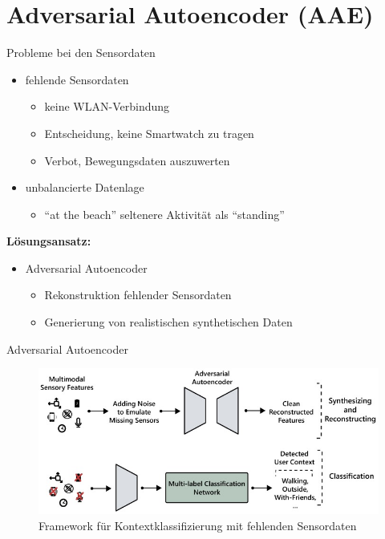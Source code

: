 \documentclass[10pt,%
	wide,%
	xcolor={x11names},%
	hyperref={colorlinks},%
	pantone312,%
	handout,%
	]{beamer}
\begin{document}
\section{Adversarial Autoencoder (AAE)}

\begin{frame}[t]{Probleme bei den Sensordaten}
	\begin{itemize}
		\item fehlende Sensordaten
		\begin{itemize}
			\item keine WLAN-Verbindung
			\item Entscheidung, keine Smartwatch zu tragen
			\item Verbot, Bewegungsdaten auszuwerten
		\end{itemize}
		\item unbalancierte Datenlage
		\begin{itemize}
			\item \enquote{at the beach} seltenere Aktivität als \enquote{standing}
		\end{itemize}
	\end{itemize}

\textbf{Lösungsansatz:}
\begin{itemize}
	\item Adversarial Autoencoder \cite{sol18}
	\begin{itemize}
		\item Rekonstruktion fehlender Sensordaten
		\item Generierung von realistischen synthetischen Daten
	\end{itemize}
\end{itemize}
\end{frame}

\begin{frame}[t]{Adversarial Autoencoder}
	\begin{figure}
		\centering
		\includegraphics[scale=4.0]{aae}
		\caption{Framework für Kontextklassifizierung mit fehlenden Sensordaten \cite{sol18}}
	\end{figure}
\end{frame}
\end{document}
